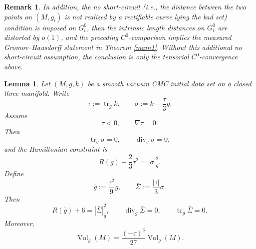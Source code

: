 \documentclass{amsart}
\newtheorem{remark}{Remark}
\newtheorem{lemma}{Lemma}[section]
\begin{document}
\begin{remark}
In addition, the no short-circuit (i.e., the distance between the two points on $(M,g_{i})$ is not realized by a rectifiable curve lying the bad set) condition is imposed on \(G_i^0\), then
the intrinsic length distances on \(G_i^0\) are distorted by \(o(1)\), and
the preceding \(C^0\)-comparison implies the measured Gromov--Hausdorff
statement in Theorem \ref{main1}.  Without this additional no short-circuit
assumption, the conclusion is only the tensorial \(C^0\)-convergence above.    
\end{remark}


\begin{lemma}
\label{lem:cmc-normalization}
Let \((M,g,k)\) be a smooth vacuum CMC initial data set on a closed
three-manifold.  Write
\[
        \tau:=\operatorname{tr}_g k,
        \qquad
        \sigma:=k-\frac{\tau}{3}g.
\]
Assume
\[
        \tau<0,
        \qquad
        \nabla\tau=0.
\]
Then
\[
        \operatorname{tr}_g\sigma=0,
        \qquad
        \operatorname{div}_g\sigma=0,
\]
and the Hamiltonian constraint is
\[
        R(g)+\frac{2}{3}\tau^2
        =
        |\sigma|_g^2.
\]
Define
\[
        \bar g:=\frac{\tau^2}{9}g,
        \qquad
        \bar\Sigma:=\frac{|\tau|}{3}\sigma.
\]
Then
\[
        R(\bar g)+6
        =
        |\bar\Sigma|_{\bar g}^2,
        \qquad
        \operatorname{div}_{\bar g}\bar\Sigma=0,
        \qquad
        \operatorname{tr}_{\bar g}\bar\Sigma=0.
\]
Moreover,
\[
        \operatorname{Vol}_{\bar g}(M)
        =
        \frac{(-\tau)^3}{27}\operatorname{Vol}_{g}(M).
\]
\end{lemma}
\end{document}
